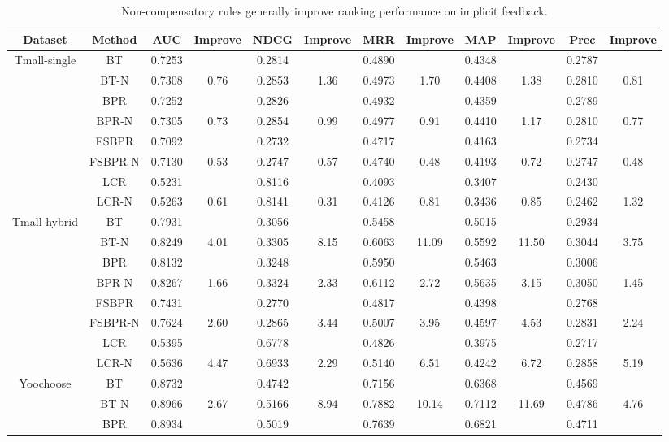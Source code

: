 \documentclass[letterpaper]{article} %
\begin{document}
\begin{table}[ht]
\caption{Non-compensatory rules generally improve ranking performance on implicit feedback.}
\scriptsize
\begin{center}
\begin{tabular}{c|c |cc |cc |cc|cc|cc}
\hline
Dataset	& Method	& AUC	& Improve&	NDCG&	Improve&	MRR	&Improve &	MAP&	Improve&	Prec	&Improve\\\hline
\multirow{6}{*}{Tmall-single} & BT & 0.7253 & &0.2814& &0.4890& &0.4348& & 0.2787 &\\
&BT-N &0.7308 & 0.76 &0.2853  &1.36 &0.4973 & 1.70 &0.4408 & 1.38 &0.2810  &0.81\\
&BPR& 0.7252 && 0.2826 && 0.4932 & &0.4359& & 0.2789 &\\
&BPR-N &0.7305 &0.73 &0.2854 & 0.99 &0.4977 &0.91 &0.4410 & 1.17 &0.2810  &0.77 \\
&FSBPR &0.7092& &0.2732 && 0.4717& &0.4163& & 0.2734 &\\ 
&FSBPR-N &0.7130 &0.53 & 0.2747 &0.57 &0.4740 &0.48 &0.4193 & 0.72 &0.2747  &0.48 \\
&LCR &0.5231 & &0.8116  && 0.4093 & &0.3407 & & 0.2430  &\\ 
&LCR-N &0.5263  &0.61 & 0.8141 &0.31 &0.4126 &0.81 &0.3436 & 0.85 &0.2462  &1.32\\
\hline
\multirow{6}{*}{Tmall-hybrid} & BT & 0.7931 & &0.3056& &0.5458& &0.5015& & 0.2934 &\\
&BT-N &0.8249 & 4.01 &0.3305  &8.15 &0.6063 & 11.09 &0.5592 & 11.50 &0.3044  &3.75\\
&BPR& 0.8132 && 0.3248 && 0.5950 & &0.5463& & 0.3006 &\\
&BPR-N &0.8267 &1.66 &0.3324 & 2.33 &0.6112 &2.72 &0.5635 & 3.15 &0.3050  &1.45 \\
&FSBPR &0.7431& &0.2770 && 0.4817& &0.4398& & 0.2768 &\\ 
&FSBPR-N &0.7624 &2.60 & 0.2865 &3.44 &0.5007 &3.95 &0.4597 & 4.53 &0.2831  &2.24 \\
&LCR &0.5395& &0.6778 && 0.4826& &0.3975& & 0.2717 &\\ 
&LCR-N &0.5636 &4.47 & 0.6933 &2.29 &0.5140 &6.51 &0.4242 & 6.72 &0.2858  &5.19\\
\hline
\multirow{6}{*}{Yoochoose} &BT & 0.8732 & &0.4742& &0.7156& &0.6368& & 0.4569 &\\
&BT-N &0.8966 & 2.67 &0.5166  &8.94 &0.7882 & 10.14 &0.7112 & 11.69 &0.4786  &4.76\\
&BPR& 0.8934 && 0.5019 && 0.7639 & &0.6821& & 0.4711 &\\

\end{tabular}
\end{center}
\end{table}
\end{document}
